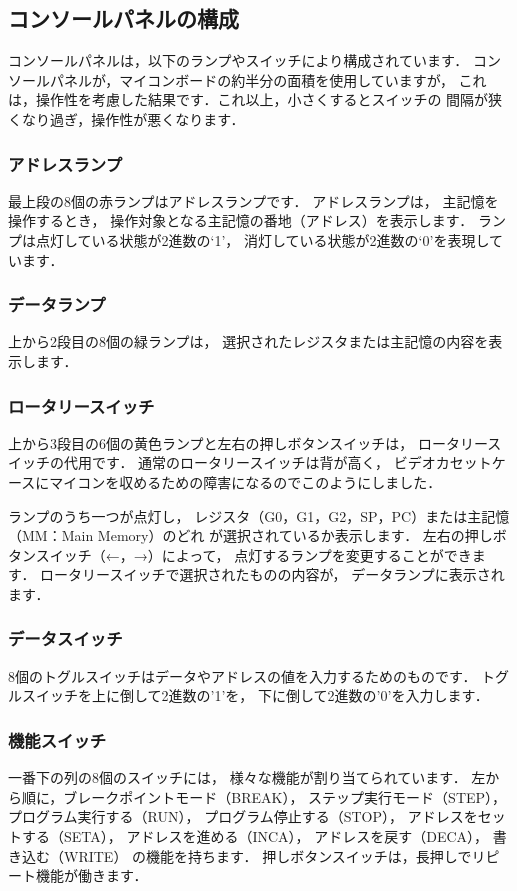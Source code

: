 
\subsection{コンソールパネルの構成}
コンソールパネルは，以下のランプやスイッチにより構成されています．
コンソールパネルが，マイコンボードの約半分の面積を使用していますが，
これは，操作性を考慮した結果です．これ以上，小さくするとスイッチの
間隔が狭くなり過ぎ，操作性が悪くなります．

\subsubsection{アドレスランプ}
最上段の8個の赤ランプはアドレスランプです．
アドレスランプは，
主記憶を操作するとき，
操作対象となる主記憶の番地（アドレス）を表示します．
ランプは点灯している状態が2進数の`1'，
消灯している状態が2進数の`0'を表現しています．

\subsubsection{データランプ}
上から2段目の8個の緑ランプは，
選択されたレジスタまたは主記憶の内容を表示します．

\subsubsection{ロータリースイッチ}
上から3段目の6個の黄色ランプと左右の押しボタンスイッチは，
ロータリースイッチの代用です．
通常のロータリースイッチは背が高く，
ビデオカセットケースにマイコンを収めるための障害になるのでこのようにしました．

ランプのうち一つが点灯し，
レジスタ（G0，G1，G2，SP，PC）または主記憶（MM：Main Memory）のどれ
が選択されているか表示します．
左右の押しボタンスイッチ（←，→）によって，
点灯するランプを変更することができます．
ロータリースイッチで選択されたものの内容が，
データランプに表示されます．

\subsubsection{データスイッチ}
8個のトグルスイッチはデータやアドレスの値を入力するためのものです．
トグルスイッチを上に倒して2進数の'1'を，
下に倒して2進数の'0'を入力します．

\subsubsection{機能スイッチ}
一番下の列の8個のスイッチには，
様々な機能が割り当てられています．
左から順に，ブレークポイントモード（BREAK），
ステップ実行モード（STEP），
プログラム実行する（RUN），
プログラム停止する（STOP），
アドレスをセットする（SETA），
アドレスを進める（INCA），
アドレスを戻す（DECA），
書き込む（WRITE）
の機能を持ちます．
押しボタンスイッチは，長押しでリピート機能が働きます．

